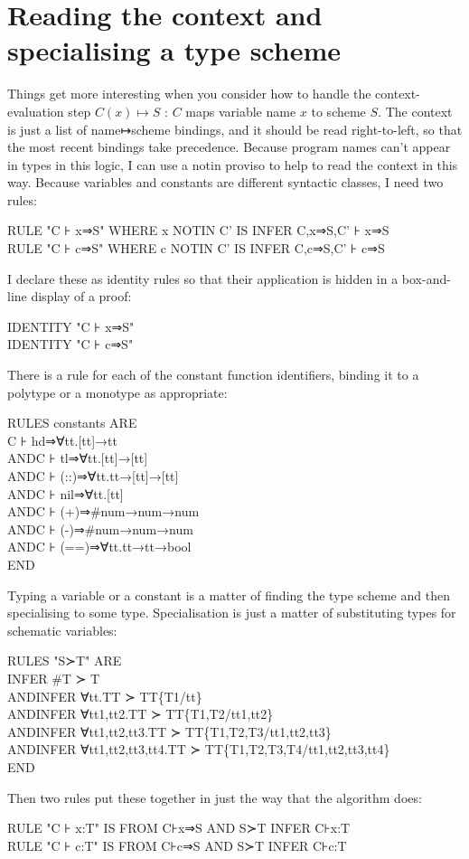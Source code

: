 \section{Reading the context and specialising a type scheme}

Things get more interesting when you consider how to handle the context-evaluation step $C(x)\mapsto S$ : $C$ maps variable name $x$ to scheme $S$. The context is just a list of name↦scheme bindings, and it should be read right-to-left, so that the most recent bindings take precedence. Because program names can't appear in types in this logic, I can use a notin proviso to help to read the context in this way. Because variables and constants are different syntactic classes, I need two rules:
\begin{japeish}
RULE "C ⊦ x⇒S" WHERE x NOTIN C' IS INFER C,x⇒S,C' ⊦ x⇒S\\
RULE "C ⊦ c⇒S" WHERE c NOTIN C' IS INFER C,c⇒S,C' ⊦ c⇒S
\end{japeish}
I declare these as identity rules so that their application is hidden in a box-and-line display of a proof:
\begin{japeish}
IDENTITY "C ⊦ x⇒S"\\
IDENTITY "C ⊦ c⇒S"
\end{japeish}

There is a rule for each of the constant function identifiers, binding it to a polytype or a monotype as appropriate:
\begin{japeish}
RULES constants ARE\\
\tab C ⊦ hd⇒∀tt.[tt]→tt\\
AND\tab C ⊦ tl⇒∀tt.[tt]→[tt]\\
AND\tab C ⊦ (::)⇒∀tt.tt→[tt]→[tt]\\
AND\tab C ⊦ nil⇒∀tt.[tt]\\
AND\tab C ⊦ (+)⇒\#num→num→num\\
AND\tab C ⊦ (-)⇒\#num→num→num\\
AND\tab C ⊦ (==)⇒∀tt.tt→tt→bool\\
END
\end{japeish}

Typing a variable or a constant is a matter of finding the type scheme and then specialising to some type. Specialisation is just a matter of substituting types for schematic variables:
\begin{japeish}
RULES "S≻T" ARE\\
\tab INFER \#T ≻ T\\
AND\tab INFER ∀tt.TT ≻ TT\{T1/tt\}\\
AND\tab INFER ∀tt1,tt2.TT ≻ TT\{T1,T2/tt1,tt2\}\\
AND\tab INFER ∀tt1,tt2,tt3.TT ≻ TT\{T1,T2,T3/tt1,tt2,tt3\}\\
AND\tab INFER ∀tt1,tt2,tt3,tt4.TT ≻ TT\{T1,T2,T3,T4/tt1,tt2,tt3,tt4\}\\
END
\end{japeish}
Then two rules put these together in just the way that the algorithm does:
\begin{japeish}
RULE "C ⊦ x:T" IS FROM C⊦x⇒S AND S≻T INFER C⊦x:T\\
RULE "C ⊦ c:T" IS FROM C⊦c⇒S AND S≻T INFER C⊦c:T
\end{japeish}

